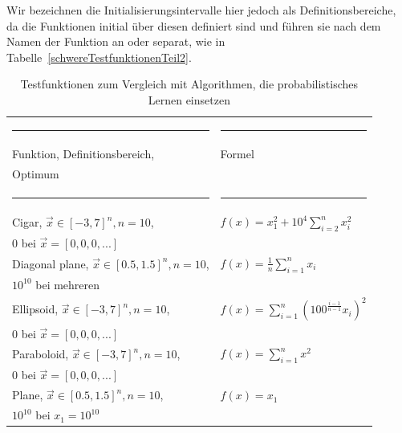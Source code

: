 \documentclass[fontsize=12, a4aper]{scrartcl}
\newcommand\Tstrut{\rule{0pt}{3ex}}           %
\begin{document}
	Wir bezeichnen die Initialisierungsintervalle hier jedoch als Definitionsbereiche, da die Funktionen initial über diesen definiert sind und führen sie nach dem Namen der Funktion an oder separat, wie in Tabelle~\ref{schwereTestfunktionenTeil2}.
	
	
	\begin{table}[H]
		
		\fontsize{10pt}{12pt}
		
		\caption{Testfunktionen zum Vergleich mit Algorithmen, die probabilistisches\hfill\newline
			Lernen einsetzen}
		
		\label{einfacheTestfunktionen}
		
		\begin{tabularx}{\textwidth}{l|l}
			
			\rule{6.4cm}{0.4pt} & \rule{8cm}{0.4pt}\\
			
			Funktion, Definitionsbereich, & Formel\\
			Optimum & \\
			
			\rule{6.4cm}{0.4pt} & \rule{8cm}{0.4pt}\\
			
			Cigar, \(\overrightarrow{x} \in [-3,7]^n, n = 10\), & \(f(x)=x_1^2 + 10^4\sum_{i=2}^{n} x_i^2\)\Tstrut\\
			0 bei \(\overrightarrow{x} = [0, 0, 0, ...]\) & \\
			
			Diagonal plane, \(\overrightarrow{x} \in [0.5,1.5]^n, n = 10\), & \(f(x)=\frac{1}{n} \sum_{i=1}^{n} x_i\)\Tstrut\\
			\(10^{10}\) bei mehreren & \\
			
			Ellipsoid, \(\overrightarrow{x} \in [-3,7]^n, n = 10\), & \(f(x)=\sum_{i=1}^{n} \left(100^\frac{i-1}{n-1} x_i\right)^2\)\Tstrut\\
			0 bei \(\overrightarrow{x} = [0, 0, 0, ...]\) & \\
			
			Paraboloid, \(\overrightarrow{x} \in [-3,7]^n, n = 10\), & \(f(x)=\sum_{i=1}^{n} x^2\)\Tstrut\\
			0 bei \(\overrightarrow{x} = [0, 0, 0, ...]\) & \\
			
			Plane, \(\overrightarrow{x} \in [0.5,1.5]^n, n = 10\), & \(f(x)=x_1\)\Tstrut\\
			\(10^{10}\) bei \(x_1 = 10^{10}\) & \\
			

\end{tabularx}
\end{table}
\end{document}
